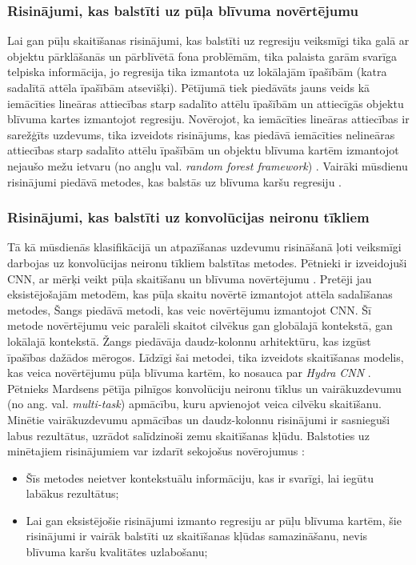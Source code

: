 \subsubsection{Risinājumi, kas balstīti uz pūļa blīvuma novērtējumu}
Lai gan pūļu skaitīšanas risinājumi, kas balstīti uz regresiju veiksmīgi tika galā ar objektu pārklāšanās un pārblīvētā fona problēmām, tika palaista garām svarīga telpiska informācija, jo regresija tika izmantota uz lokālajām īpašībām (katra sadalītā attēla īpašībām atsevišķi). Pētījumā \cite{lempitsky2010learning} tiek piedāvāts jauns veids kā iemācīties lineāras attiecības starp sadalīto attēlu īpašībām un attiecīgās objektu blīvuma kartes izmantojot regresiju. Novērojot, ka iemācīties lineāras attiecības ir sarežģīts uzdevums, tika izveidots risinājums, kas piedāvā iemācīties nelineāras attiecības starp sadalīto attēlu īpašībām un objektu blīvuma kartēm izmantojot nejaušo mežu ietvaru (no angļu val. \textit{random forest framework}) \cite{pham2015count}. Vairāki mūsdienu risinājumi piedāvā metodes, kas balstās uz blīvuma karšu regresiju \cite{wang2016fast,xia2016block}. 

\subsubsection{Risinājumi, kas balstīti uz konvolūcijas neironu tīkliem}
Tā kā mūsdienās klasifikācijā un atpazīšanas uzdevumu risināšanā ļoti veiksmīgi darbojas uz konvolūcijas neironu tīkliem balstītas metodes. Pētnieki ir izveidojuši CNN, ar mērķi veikt pūļa skaitīšanu un blīvuma novērtējumu \cite{wang2015deep,shang2016end,walach2016learning}. Pretēji jau eksistējošajām metodēm, kas pūļa skaitu novērtē izmantojot attēla sadalīšanas metodes, Šangs \cite{shang2016end} piedāvā metodi, kas veic novērtējumu izmantojot CNN. Šī metode novērtējumu veic paralēli skaitot cilvēkus gan globālajā kontekstā, gan lokālajā kontekstā. Žangs \cite{zhang2016single} piedāvāja daudz-kolonnu arhitektūru, kas izgūst īpašības dažādos mērogos. Līdzīgi šai metodei, tika izveidots skaitīšanas modelis, kas veica novērtējumu pūļa blīvuma kartēm, ko nosauca par \textit{Hydra CNN} \cite{onoro2016towards}. Pētnieks Mardsens \cite{marsden2017resnetcrowd} pētīja pilnīgos konvolūciju neironu tīklus un vairākuzdevumu (no ang. val. \textit{multi-task}) apmācību, kuru apvienojot veica cilvēku skaitīšanu. Minētie vairākuzdevumu apmācības un daudz-kolonnu risinājumi ir sasnieguši labus rezultātus, uzrādot salīdzinoši zemu skaitīšanas kļūdu. Balstoties uz minētajiem risinājumiem var izdarīt sekojošus novērojumus \cite{sindagi2017generating}:
\begin{itemize}
	\item Šīs metodes neietver kontekstuālu informāciju, kas ir svarīgi, lai iegūtu labākus rezultātus;
	\item Lai gan eksistējošie risinājumi izmanto regresiju ar pūļu blīvuma kartēm, šie risinājumi ir vairāk balstīti uz skaitīšanas kļūdas samazināšanu, nevis blīvuma karšu kvalitātes uzlabošanu;
\end{itemize}

